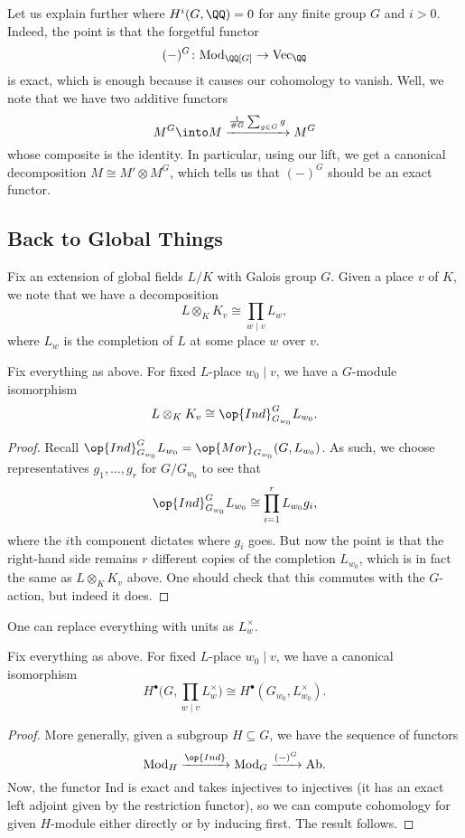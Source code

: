 \documentclass[../notes.tex]{subfiles}
\begin{document}
\begin{remark}
	Let us explain further where $H^i(G,\QQ)=0$ for any finite group $G$ and $i>0$. Indeed, the point is that the forgetful functor
	\[(-)^G\colon\mathrm{Mod}_{\QQ[G]}\to\mathrm{Vec}_\QQ\]
	is exact, which is enough because it causes our cohomology to vanish. Well, we note that we have two additive functors
	\[M^G\into M\xrightarrow{\frac1{\#G}\sum_{g\in G}g}M^G\]
	whose composite is the identity. In particular, using our lift, we get a canonical decomposition $M\cong M'\otimes M^G$, which tells us that $(-)^G$ should be an exact functor.
\end{remark}

\subsection{Back to Global Things}
Fix an extension of global fields $L/K$ with Galois group $G$. Given a place $v$ of $K$, we note that we have a decomposition
\[L\otimes_KK_v\cong\prod_{w\mid v}L_w,\]
where $L_w$ is the completion of $L$ at some place $w$ over $v$.
\begin{proposition}
	Fix everything as above. For fixed $L$-place $w_0\mid v$, we have a $G$-module isomorphism
	\[L\otimes_KK_v\cong\op{Ind}_{G_{w_0}}^GL_{w_0}.\]
\end{proposition}
\begin{proof}
	Recall $\op{Ind}_{G_{w_0}}^GL_{w_0}=\op{Mor}_{G_{w_0}}(G,L_{w_0})$. As such, we choose representatives $g_1,\ldots,g_r$ for $G/G_{w_0}$ to see that
	\[\op{Ind}_{G_{w_0}}^GL_{w_0}\cong\prod_{i=1}^rL_{w_0}g_i,\]
	where the $i$th component dictates where $g_i$ goes. But now the point is that the right-hand side remains $r$ different copies of the completion $L_{w_0}$, which is in fact the same as $L\otimes_KK_v$ above. One should check that this commutes with the $G$-action, but indeed it does.
\end{proof}
\begin{remark}
	One can replace everything with units as $L_w^\times$.
\end{remark}
\begin{corollary} \label{cor:get-to-induced}
	Fix everything as above. For fixed $L$-place $w_0\mid v$, we have a canonical isomorphism
	\[H^\bullet\Bigg(G,\prod_{w\mid v}L_w^\times\Bigg)\cong H^\bullet(G_{w_0},L_{w_0}^\times).\]
\end{corollary}
\begin{proof}
	More generally, given a subgroup $H\subseteq G$, we have the sequence of functors
	\[\mathrm{Mod}_H\xrightarrow{\op{Ind}}\mathrm{Mod}_G\xrightarrow{(-)^G}\mathrm{Ab}.\]
	Now, the functor $\mathrm{Ind}$ is exact and takes injectives to injectives (it has an exact left adjoint given by the restriction functor), so we can compute cohomology for given $H$-module either directly or by inducing first. The result follows.
\end{proof}
\end{document}
